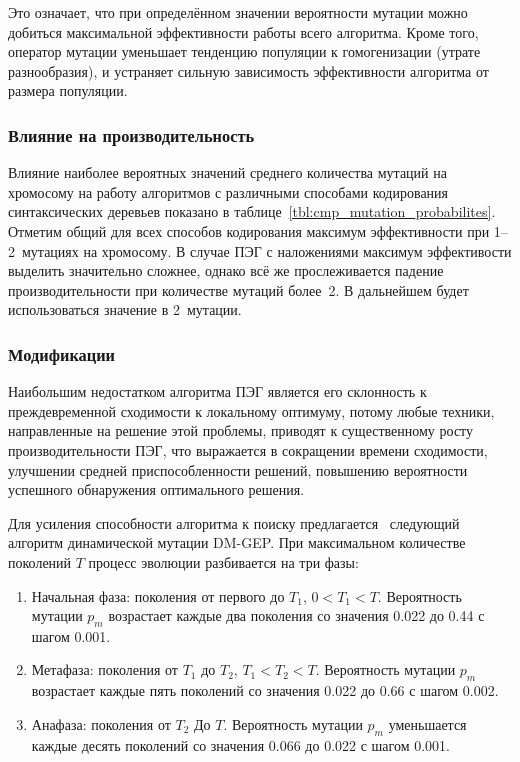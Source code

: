 Это означает, что при определённом значении вероятности мутации можно добиться максимальной эффективности работы всего алгоритма. Кроме того, оператор мутации уменьшает тенденцию популяции к гомогенизации (утрате разнообразия), и устраняет сильную зависимость эффективности алгоритма от размера популяции.


\subsubsection{Влияние на производительность}

Влияние наиболее вероятных значений среднего количества мутаций на хромосому на работу алгоритмов с различными способами кодирования синтаксических деревьев показано в таблице~\ref{tbl:cmp_mutation_probabilites}. Отметим общий для всех способов кодирования максимум эффективности при 1--2~мутациях на хромосому. В случае ПЭГ с наложениями максимум эффективости выделить значительно сложнее, однако всё же прослеживается падение производительности при количестве мутаций более~2. В дальнейшем будет использоваться значение в 2~мутации.




\subsubsection{Модификации}

Наибольшим недостатком алгоритма ПЭГ является его склонность к преждевременной сходимости к локальному оптимуму, потому любые техники, направленные на решение этой проблемы, приводят к существенному росту производительности ПЭГ, что выражается в сокращении времени сходимости, улучшении средней приспособленности решений, повышению вероятности успешного обнаружения оптимального решения.

Для усиления способности алгоритма к поиску предлагается~\cite{2008acat.confE.66T} следующий алгоритм динамической мутации DM-GEP. При максимальном количестве поколений $T$ процесс эволюции разбивается на три фазы:
\begin{enumerate} \itemsep0pt \parskip0pt 
  \item Начальная фаза: поколения от первого до $T_1$, $0 < T_1 < T$. Вероятность мутации $p_m$ возрастает каждые два поколения со значения 0.022 до 0.44 с шагом 0.001.
  \item Метафаза: поколения от $T_1$ до $T_2$, $T_1 < T_2 < T$. Вероятность мутации $p_m$ возрастает каждые пять поколений со значения 0.022 до 0.66 с шагом 0.002.
  \item Анафаза: поколения от $T_2$ До $T$. Вероятность мутации $p_m$ уменьшается каждые десять поколений со значения 0.066 до 0.022 с шагом 0.001.
\end{enumerate}

